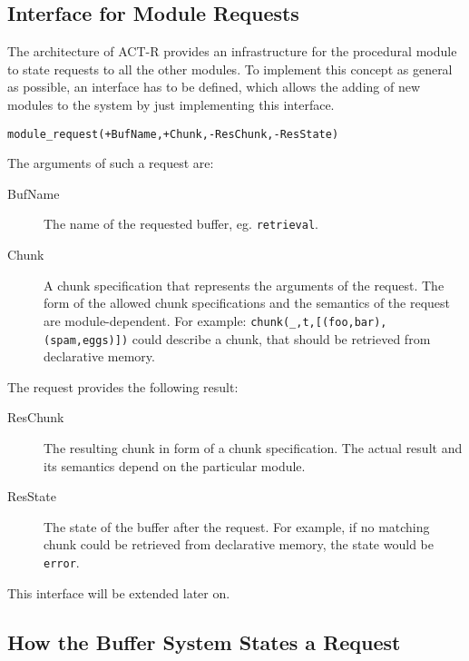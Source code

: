 \subsection{Interface for Module Requests}
\label{interface_for_module_requests}

The architecture of ACT-R provides an infrastructure for the procedural module to state requests to all the other modules. To implement this concept as general as possible, an interface has to be defined, which allows the adding of new modules to the system by just implementing this interface.

\begin{lstlisting}[caption={Simple Interface ``Module''},label=lst:interface_module]
module_request(+BufName,+Chunk,-ResChunk,-ResState)
\end{lstlisting}

The arguments of such a request are:

\begin{description}
 \item[BufName] The name of the requested buffer, eg. \verb|retrieval|.
 \item[Chunk] A chunk specification that represents the arguments of the request. The form of the allowed chunk specifications and the semantics of the request are module-dependent. For example: \verb|chunk(_,t,[(foo,bar),(spam,eggs)])| could describe a chunk, that should be retrieved from declarative memory.
\end{description}

The request provides the following result:

\begin{description}
 \item[ResChunk] The resulting chunk in form of a chunk specification. The actual result and its semantics depend on the particular module.
 \item[ResState] The state of the buffer after the request. For example, if no matching chunk could be retrieved from declarative memory, the state would be \verb|error|.
\end{description}

This interface will be extended later on.

\subsection{How the Buffer System States a Request}
\label{how_the_buffer_system_states_a_request}

